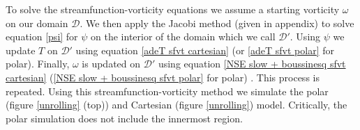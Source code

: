 \documentclass{article}
\begin{document}
\newline
To solve the streamfunction-vorticity equations we assume a starting vorticity $\omega$ on our domain $\mathcal{D}$. We then apply the Jacobi method (given in appendix) to solve equation \ref{psi} for $\psi$ on the interior of the domain which we call $\mathcal{D}'$. 
Using $\psi$ we update $T$ on $\mathcal{D}'$ using equation \ref{adeT sfvt cartesian} (or \ref{adeT sfvt polar} for polar). Finally, $\omega$ is updated on $\mathcal{D}'$ using 
equation \ref{NSE slow + boussinesq sfvt cartesian} (\ref{NSE slow + boussinesq sfvt polar} for polar) \cite{adair2015developing}. This process is repeated.
\newline
Using this streamfunction-vorticity method we simulate the polar (figure \ref{unrolling} (top)) and Cartesian (figure \ref{unrolling}) model. Critically, the polar simulation does not include the innermost region.
\end{document}
